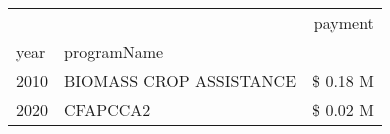 \begin{tabular}{llr}
\toprule
 &  & payment \\
year & programName &  \\
\midrule
2010 & BIOMASS CROP ASSISTANCE & \$ 0.18 M \\
\cline{1-3}
2020 & CFAPCCA2 & \$ 0.02 M \\
\cline{1-3}
\bottomrule
\end{tabular}
